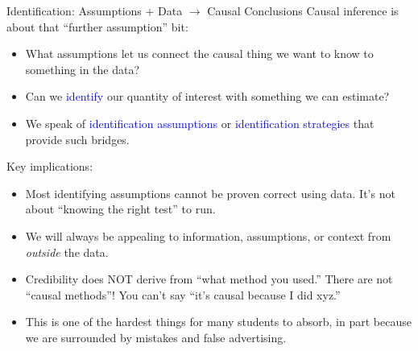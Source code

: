 \documentclass[xcolor=dvipsnames]{beamer}
\begin{document}
\begin{frame}{Identification: Assumptions + Data $\rightarrow$ Causal Conclusions}
\footnotesize
{} Causal inference is about that ``further assumption'' bit:
\begin{itemize}
\item<2-> What assumptions let us connect the causal thing we want to know to something in the data?
\item<3-> Can we \textcolor{blue}{identify} our quantity of interest with something we can estimate?
\item<4-> We speak of \textcolor{blue}{identification assumptions} or \textcolor{blue}{identification strategies} that provide such bridges.
\end{itemize}
\medskip
{} Key implications:
\begin{itemize}
\item<6-> Most identifying assumptions cannot be proven correct using data. It's not about ``knowing the right test'' to run.
\item<7-> We will always be appealing to information, assumptions, or context from \textit{outside} the data.
\item<8-> Credibility does NOT derive from ``what method you used.'' There are not ``causal methods''! You can't say ``it's causal because I did xyz.''
\item<9-> This is one of the hardest things for many students to absorb, in part because we are surrounded by mistakes and false advertising.
\end{itemize}
\end{frame}
\end{document}

